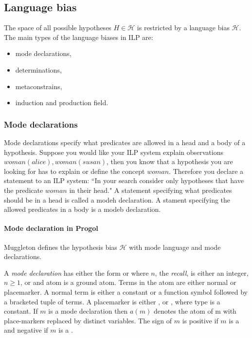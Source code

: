 \subsection{Language bias}\label{subsec:background_language_bias}
The space of all possible hypotheses $H \in \mathcal{H}$ is restricted by a language bias $\mathcal{H}$. The main types of the language biases in ILP are:
\begin{itemize}
\item mode declarations,
\item determinations,
\item metaconstrains,
\item induction and production field.
\end{itemize}

\subsubsection{Mode declarations}\label{background_mode_declarations}
Mode declarations specify what predicates are allowed in a head and a body of a hypothesis.
Suppose you would like your ILP system explain observations
$woman(alice), woman(susan)$, then you know that a hypothesis you are looking for has to explain or define the concept $woman$. Therefore you declare a statement to an ILP system: ``In your search consider only hypotheses that have the predicate $woman$ in their head." A statement specifying what predicates should be in a head is called a modeh declaration. A stament specifying the allowed predicates in a body is a modeb declaration.

\paragraph{Mode declaration in Progol}
Muggleton defines the hypothesis bias $\mathcal{H}$ with mode language and mode declarations.
\begin{defn}\cite{muggleton1995inverse}
A \emph{mode declaration} has either the form
 or  where $n$, the \emph{recall}, is either an integer, $n \ge 1$,
or \tc{*} and atom is a ground atom. Terms in the atom are either normal or placemarker. A normal term is either a constant or a function symbol followed by a
bracketed tuple of terms. A placemarker is either ,  or , where
type is a constant. If $m$ is a mode declaration then $a(m)$ denotes the atom of m
with place-markers replaced by distinct variables. The sign of $m$ is positive if $m$
is a  and negative if $m$ is a .
\end{defn}

